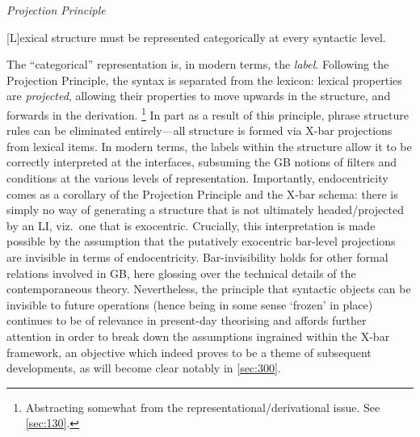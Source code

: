 \begin{example}\label{ex:PP}
\setlength{\parskip}{0pt}\setlength{\parsep}{0pt}
\textit{Projection Principle}

[L]exical structure must be represented categorically at every syntactic level. \parencite[84]{ChomskyN_1986}
\end{example}
\noindent
The ``categorical'' representation is, in modern terms, the \textit{label}. Following the Projection Principle, the syntax is separated from the lexicon: lexical properties are \textit{projected}, allowing their properties to move upwards in the structure, and forwards in the derivation.%
\footnote{Abstracting somewhat from the representational/derivational issue. See \autoref{sec:130}.}
In part as a result of this principle, phrase structure rules can be eliminated entirely---all structure is formed via X-bar projections from lexical items. In modern terms, the labels within the structure allow it to be correctly interpreted at the interfaces, subsuming the GB notions of filters and conditions at the various levels of representation. Importantly, endocentricity comes as a corollary of the Projection Principle and the X-bar schema: there is simply no way of generating a structure that is not ultimately headed/projected by an LI, viz.~one that is exocentric. Crucially, this interpretation is made possible by the assumption that the putatively exocentric bar-level projections are invisible in terms of endocentricity. Bar-invisibility holds for other formal relations involved in GB, here glossing over the technical details of the contemporaneous theory. Nevertheless, the principle that syntactic objects can be invisible to future operations (hence being in some sense `frozen' in place) continues to be of relevance in present-day theorising and affords further attention in order to break down the assumptions ingrained within the X-bar framework, an objective which indeed proves to be a theme of subsequent developments, as will become clear notably in \autoref{sec:300}.

